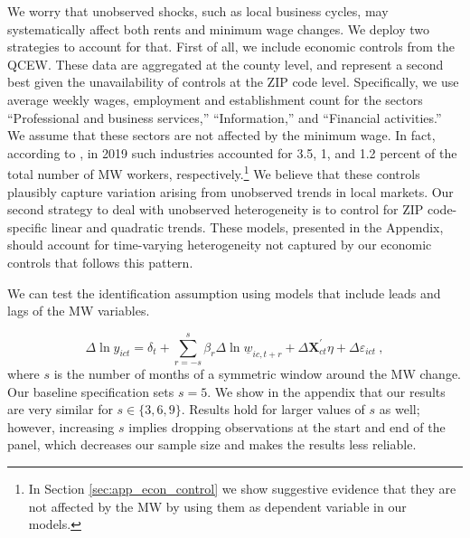We worry that unobserved shocks, such as local business cycles, may systematically affect 
both rents and minimum wage changes. We deploy two strategies to account for that. First 
of all, we include economic controls from the QCEW. 
These data are aggregated at the county level, and represent a second best given the 
unavailability of controls at the ZIP code level. Specifically, we use average weekly wages, 
employment and establishment count for the sectors ``Professional and business services,'' 
``Information,'' and ``Financial activities.'' We assume that these sectors are not affected 
by the minimum wage. In fact, according to \textcite[][table 5]{MinWorkersReportBLS}, in 2019 
such industries accounted for 3.5, 1, and 1.2 percent of the total number of MW workers, 
respectively.\footnote{In Section \ref{sec:app_econ_control} we show suggestive evidence 
	that they are not affected by the MW by using them as dependent variable in our models.}
We believe that these controls plausibly capture variation arising from unobserved trends 
in local markets. Our second strategy to deal with unobserved heterogeneity is to control for
ZIP code-specific linear and quadratic trends. These models, presented in the Appendix, 
should account for time-varying heterogeneity not captured by our economic controls that 
follows this pattern.

We can test the identification assumption using models that include leads and lags
of the MW variables.

\begin{equation} \label{eq:leads_lags}
	\Delta \ln y_{ict} = \delta_t
						+ \sum_{r=-s}^{s} \beta_r \Delta \ln \underline{w}_{ic,t+r}
						+ \Delta \mathbf{X}^{'}_{ct}\eta
						+ \Delta \varepsilon_{ict} \ ,
\end{equation}
where $s$ is the number of months of a symmetric window around the MW change. Our baseline
specification sets $s = 5$. We show in the appendix that our results are very similar for
$s \in \{3, 6, 9\}$. Results hold for larger values of $s$ as well; however, increasing 
$s$ implies dropping observations at the start and end of the panel, which decreases our 
sample size and makes the results less reliable.

